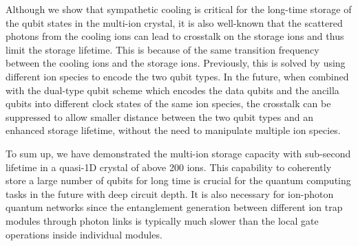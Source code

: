 Although we show that sympathetic cooling is critical for the long-time storage of the qubit states in the multi-ion crystal, it is also well-known that the scattered photons from the cooling ions can lead to crosstalk on the storage ions and thus limit the storage lifetime. This is because of the same transition frequency between the cooling ions and the storage ions. Previously, this is solved by using different ion species to encode the two qubit types. In the future, when combined with the dual-type qubit scheme which encodes the data qubits and the ancilla qubits into different clock states of the same ion species, the crosstalk can be suppressed to allow smaller distance between the two qubit types and an enhanced storage lifetime, without the need to manipulate multiple ion species.

To sum up, we have demonstrated the multi-ion storage capacity with sub-second lifetime in a quasi-1D crystal of above 200 ions. This capability to coherently store a large number of qubits for long time is crucial for the quantum computing tasks in the future with deep circuit depth. It is also necessary for ion-photon quantum networks since the entanglement generation between different ion trap modules through photon links is typically much slower than the local gate operations inside individual modules.
